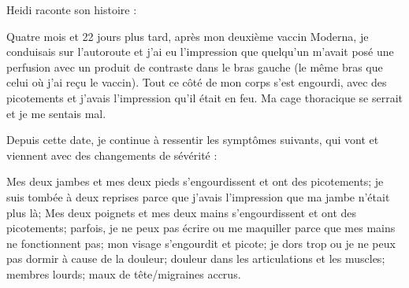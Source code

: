 Heidi raconte son histoire :

Quatre mois et 22 jours plus tard, après mon deuxième vaccin Moderna, je
conduisais sur l'autoroute et j'ai eu l'impression que quelqu'un m'avait posé
une perfusion avec un produit de contraste dans le bras gauche (le même bras que
celui où j'ai reçu le vaccin). Tout ce côté de mon corps s'est engourdi, avec
des picotements et j'avais l'impression qu'il était en feu. Ma cage thoracique
se serrait et je me sentais mal.

Depuis cette date, je continue à ressentir les symptômes suivants, qui vont et
viennent avec des changements de sévérité :

Mes deux jambes et mes deux pieds s'engourdissent et ont des picotements; je
suis tombée à deux reprises parce que j'avais l'impression que ma jambe n'était
plus là; Mes deux poignets et mes deux mains s'engourdissent et ont des
picotements; parfois, je ne peux pas écrire ou me maquiller parce que mes mains
ne fonctionnent pas; mon visage s'engourdit et picote; je dors trop ou je ne
peux pas dormir à cause de la douleur; douleur dans les articulations et les
muscles; membres lourds; maux de tête/migraines accrus.

